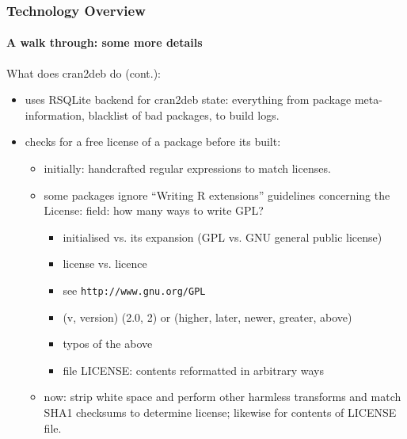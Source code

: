 \documentclass[smaller,compress]{beamer}
\begin{document}
\begin{frame}
  \frametitle{Technology Overview} 
  \framesubtitle{A walk through: some more details}

  What does cran2deb do (cont.):
  \begin{itemize}
  \item uses RSQLite backend for cran2deb state: everything from package
    meta-information, blacklist of bad packages, to build logs. 
  \item checks for a free license of a package before its built:
    \begin{itemize}
        \item initially: handcrafted regular expressions to match
                licenses.
        \item some packages ignore ``Writing R extensions'' guidelines
          concerning the License: field: how many ways to write GPL? 
            \begin{itemize}
                \item initialised vs. its expansion (GPL vs. GNU general public license)
                \item license vs. licence
                \item see \texttt{http://www.gnu.org/GPL}
                \item (v, version) (2.0, 2) or (higher, later, newer, greater, above)
                \item typos of the above
                \item file LICENSE: contents reformatted in arbitrary ways
            \end{itemize}
        \item now: strip white space and perform other harmless transforms
                and match SHA1 checksums to determine license;  likewise for contents of LICENSE
                file.
    \end{itemize}
  \end{itemize}
\end{frame}  
\end{document}
